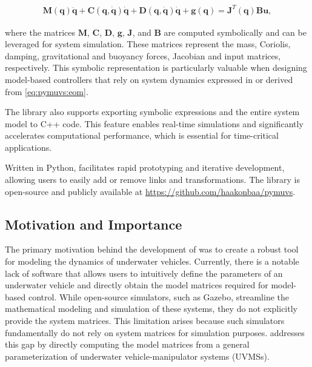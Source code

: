 \begin{align}
    \bm{M}(\bm{q}) \ddot{\bm{q}} + \bm{C}(\bm{q}, \dot{\bm{q}}) \dot{\bm{q}} +
    \bm{D}(\bm{q}, \dot{\bm{q}}) \dot{\bm{q}} + \bm{g}(\bm{q}) = \bm{J}^T(\bm{q}) \bm{B} \bm{u},
    \label{eq:pymuvs:eom}
\end{align}

where the matrices $\bm{M}$, $\bm{C}$, $\bm{D}$, $\bm{g}$, $\bm{J}$, and 
$\bm{B}$ are computed symbolically and can be leveraged for system simulation. 
These matrices represent the mass, Coriolis, damping, gravitational and buoyancy
forces, Jacobian and input matrices, respectively.
This symbolic representation is particularly valuable when designing 
model-based controllers that rely on system dynamics expressed in or derived 
from \autoref{eq:pymuvs:eom}.

The library also supports exporting symbolic expressions and the entire system 
model to C++ code. This feature enables real-time simulations and significantly 
accelerates computational performance, which is essential for time-critical 
applications.

Written in Python, \pymuvs{} facilitates rapid prototyping and iterative 
development, allowing users to easily add or remove links and transformations. 
The library is open-source and publicly available at 
\url{https://github.com/haakonbaa/pymuvs}.



\subsection{Motivation and Importance}

The primary motivation behind the development of \pymuvs{} was to create a 
robust tool for modeling the dynamics of underwater vehicles. Currently, there 
is a notable lack of software that allows users to intuitively define the 
parameters of an underwater vehicle and directly obtain the model matrices 
required for model-based control. While open-source simulators, such as Gazebo, 
streamline the mathematical modeling and simulation of these systems, they do 
not explicitly provide the system matrices. This limitation arises because such 
simulators fundamentally do not rely on system matrices for simulation 
purposes. \pymuvs{} addresses this gap by directly computing the model matrices 
from a general parameterization of underwater vehicle-manipulator systems (UVMSs).  

